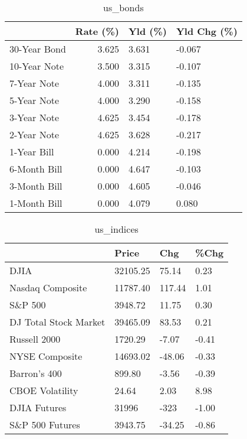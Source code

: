 \documentclass{article}%
\begin{document}
\begin{table}[htbp]%
\caption{us\_bonds}%
\centering%
\begin{adjustbox}{width=1\textwidth}%
\begin{tabular}{lrll}
\toprule
             &  Rate (\%) & Yld (\%) & Yld Chg (\%) \\
\midrule
30-Year Bond &     3.625 &   3.631 &      -0.067 \\
10-Year Note &     3.500 &   3.315 &      -0.107 \\
 7-Year Note &     4.000 &   3.311 &      -0.135 \\
 5-Year Note &     4.000 &   3.290 &      -0.158 \\
 3-Year Note &     4.625 &   3.454 &      -0.178 \\
 2-Year Note &     4.625 &   3.628 &      -0.217 \\
 1-Year Bill &     0.000 &   4.214 &      -0.198 \\
6-Month Bill &     0.000 &   4.647 &      -0.103 \\
3-Month Bill &     0.000 &   4.605 &      -0.046 \\
1-Month Bill &     0.000 &   4.079 &       0.080 \\
\bottomrule
\end{tabular}
%
\end{adjustbox}%
\end{table}

%


\begin{table}[htbp]%
\caption{us\_indices}%
\centering%
\begin{adjustbox}{width=1\textwidth}%
\begin{tabular}{llll}
\toprule
                      &    Price &    Chg &  \%Chg \\
\midrule
                 DJIA & 32105.25 &  75.14 &  0.23 \\
     Nasdaq Composite & 11787.40 & 117.44 &  1.01 \\
              S\&P 500 &  3948.72 &  11.75 &  0.30 \\
DJ Total Stock Market & 39465.09 &  83.53 &  0.21 \\
         Russell 2000 &  1720.29 &  -7.07 & -0.41 \\
       NYSE Composite & 14693.02 & -48.06 & -0.33 \\
         Barron's 400 &   899.80 &  -3.56 & -0.39 \\
      CBOE Volatility &    24.64 &   2.03 &  8.98 \\
         DJIA Futures &    31996 &   -323 & -1.00 \\
      S\&P 500 Futures &  3943.75 & -34.25 & -0.86 \\
\bottomrule
\end{tabular}
%
\end{adjustbox}%
\end{table}
\end{document}
